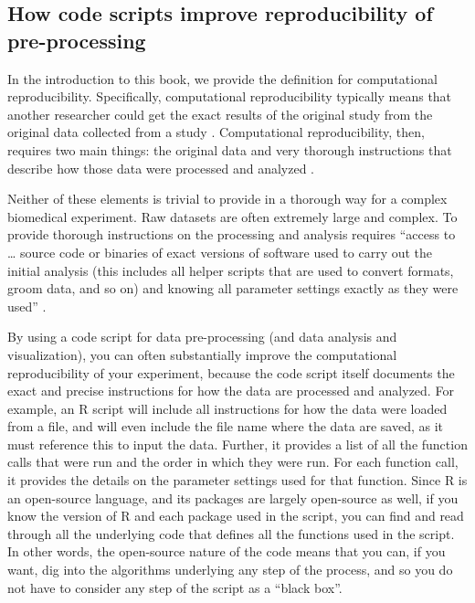 \documentclass[]{tufte-book}
\begin{document}
\subsection{How code scripts improve reproducibility of pre-processing}\label{how-code-scripts-improve-reproducibility-of-pre-processing}

In the introduction to this book, we provide the definition for computational
reproducibility. Specifically, computational reproducibility typically means
that another researcher could get the exact results of the original study from
the original data collected from a study \citep{stark2018before}. Computational
reproducibility, then, requires two main things: the original data and very
thorough instructions that describe how those data were processed and analyzed
\citep{nekrutenko2012next}.

Neither of these elements is trivial to provide in a thorough way for a complex
biomedical experiment. Raw datasets are often extremely large and complex. To
provide thorough instructions on the processing and analysis requires ``access to
\ldots{} source code or binaries of exact versions of software used to carry out the
initial analysis (this includes all helper scripts that are used to convert
formats, groom data, and so on) and knowing all parameter settings exactly as
they were used'' \citep{nekrutenko2012next}.

By using a code script for data pre-processing (and data analysis and
visualization), you can often substantially improve the computational
reproducibility of your experiment, because the code script itself documents the
exact and precise instructions for how the data are processed and analyzed. For
example, an R script will include all instructions for how the data were loaded
from a file, and will even include the file name where the data are saved, as it
must reference this to input the data. Further, it provides a list of all the
function calls that were run and the order in which they were run. For each
function call, it provides the details on the parameter settings used for that
function. Since R is an open-source language, and its packages are largely
open-source as well, if you know the version of R and each package used in the
script, you can find and read through all the underlying code that defines all
the functions used in the script. In other words, the open-source nature of the
code means that you can, if you want, dig into the algorithms underlying any
step of the process, and so you do not have to consider any step of the script
as a ``black box''.
\end{document}
